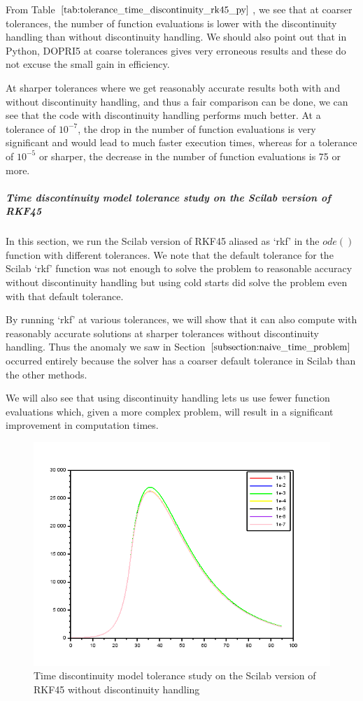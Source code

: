 From Table $\ref{tab:tolerance_time_discontinuity_rk45_py}$, we see that at coarser tolerances, the number of function evaluations is lower with the discontinuity handling than without discontinuity handling. We should also point out that in Python, DOPRI5 at coarse tolerances gives very erroneous results and these do not excuse the small gain in efficiency.

At sharper tolerances where we get reasonably accurate results both with and without discontinuity handling, and thus a fair comparison can be done, we can see that the code with discontinuity handling performs much better. At a tolerance of $10^{-7}$, the drop in the number of function evaluations is very significant and would lead to much faster execution times, whereas for a tolerance of $10^{-5}$ or sharper, the decrease in the number of function evaluations is 75 or more.

\subparagraph{Time discontinuity model tolerance study on the Scilab version of RKF45}
In this section, we run the Scilab version of RKF45 aliased as `rkf' in the $ode()$ function with different tolerances. We note that the default tolerance for the Scilab `rkf' function was not enough to solve the problem to reasonable accuracy without discontinuity handling but using cold starts did solve the problem even with that default tolerance. 

By running `rkf' at various tolerances, we will show that it can also compute with reasonably accurate solutions at sharper tolerances without discontinuity handling. Thus the anomaly we saw in Section $\ref{subsection:naive_time_problem}$ occurred entirely because the solver has a coarser default tolerance in Scilab than the other methods.

We will also see that using discontinuity handling lets us use fewer function evaluations which, given a more complex problem, will result in a significant improvement in computation times.

\begin{figure}[h]
\centering
\includegraphics[width=0.7\linewidth]{./figures/tolerance_time_rk45_no_event_sci}
\caption{Time discontinuity model tolerance study on the Scilab version of RKF45 without discontinuity handling}
\label{fig:tolerance_time_rk45_no_event_sci}
\end{figure}

